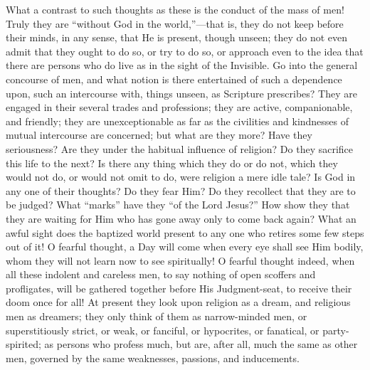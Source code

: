 What a contrast to such thoughts as these is the conduct of the mass
of men! Truly they are ``without God in the world,''—that is,
they do not keep before their minds, in any sense, that He is present,
though unseen; they do not even admit that they ought to do so, or try
to do so, or approach even to the idea that there are persons who do
live as in the sight of the Invisible. Go into the general concourse of
men, and what notion is there entertained of such a dependence upon,
such an intercourse with, things unseen, as Scripture prescribes? They
are engaged in their several trades and professions; they are active,
companionable, and friendly; they are unexceptionable as far as the
civilities and kindnesses of mutual intercourse are concerned; but what
are they more? Have they seriousness? Are they under the habitual
influence of religion? Do they sacrifice this life to the next? Is there
any thing which they do or do not, which they would not do, or would not
omit to do, were religion a mere idle tale? Is God in any one of their
thoughts? Do they fear Him? Do they recollect that they are to be
judged? What ``marks'' have they ``of the Lord Jesus?''
How show they that they are waiting for Him who has gone away only to
come back again? What an awful sight does the baptized world present to
any one who retires some few steps out of it! O fearful thought, a Day
will come when every eye shall see Him bodily, whom they will not learn
now to see spiritually! O fearful thought indeed, when all these
indolent and careless men, to say nothing of open scoffers and
profligates, will be gathered together before His Judgment-seat, to
receive their doom once for all! At present they look upon religion as a
dream, and religious men as dreamers; they only think of them as
narrow-minded men, or superstitiously strict, or weak, or fanciful, or
hypocrites, or fanatical, or party-spirited; as persons who profess
much, but are, after all, much the same as other men, governed by the
same weaknesses, passions, and inducements.

